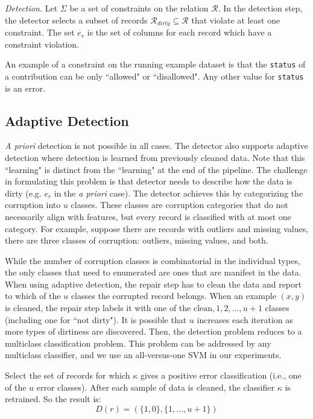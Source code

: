 \vspace{0.5em}

\emph{Detection. } Let $\Sigma$ be a set of constraints on the relation $\mathcal{R}$. 
In the detection step, the detector selects a subset of records $\mathcal{R}_{dirty} \subseteq \mathcal{R}$ that violate at least one constraint.
The set $e_r$ is the set of columns for each record which have a constraint violation. 

\begin{example}\label{detex1}
An example of a constraint on the running example dataset is that the \texttt{status} of
a contribution can be only ``allowed" or ``disallowed".
Any other value for \texttt{status} is an error.
\end{example}

\subsection{Adaptive Detection}
\emph{A priori} detection is not possible in all cases.
The detector also supports adaptive detection where detection is learned from previously cleaned data.
Note that this ``learning" is distinct from the ``learning" at the end of the pipeline.
The challenge in formulating this problem is that detector needs to describe how the data is dirty (e.g. $e_r$ in the \emph{a priori} case).
The detector achieves this by categorizing the corruption into $u$ classes.
These classes are corruption categories that do not necessarily align with features, but every record is classified with at most one category.
For example, suppose there are records with outliers and missing values, there are three classes of corruption: outliers, missing values, and both.

While the number of corruption classes is combinatorial in the individual types, the only classes that need to enumerated are ones that are manifest in the data.
When using adaptive detection, the repair step has to clean the data and report to which of the $u$ classes the corrupted record belongs.
When an example $(x,y)$ is cleaned, the repair step labels it with one of the ${\text{clean}, 1,2,...,u+1}$ classes (including one for ``not dirty").
It is possible that $u$ increases each iteration as more types of dirtiness are discovered. 
Then, the detection problem reduces to a multiclass classification problem.
This problem can be addressed by any multiclass classifier, and we use an all-versus-one SVM in our experiments.

\begin{definition}
Select the set of records for which $\kappa$ gives a positive error classification (i.e., one of the $u$ error classes).
After each sample of data is cleaned, the classifier $\kappa$ is retrained.
So the result is:
\[D(r) = (\{1,0\},\{1,...,u+1\})\]
\end{definition}

